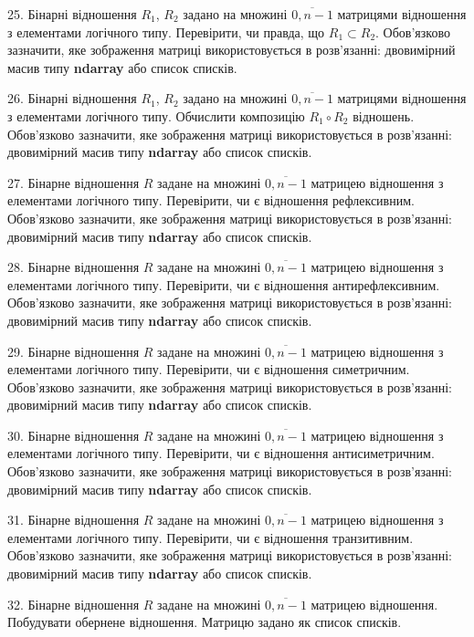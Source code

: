 \documentclass[10pt, ukrainian]{article}
\begin{document}
{\begin {Large}
25. Бінарні відношення $R_1$, $R_2$ задано на множині $\overline{0,n-1}$ матрицями відношення з елементами логічного типу. Перевірити, чи правда, що $R_1\subset R_2$. Обов'язково зазначити, яке зображення матриці використовується в розв'язанні: двовимірний масив типу \textbf{ndarray} або список списків.

26. Бінарні відношення $R_1$, $R_2$ задано на множині $\overline{0,n-1}$ матрицями відношення з елементами логічного типу. Обчислити композицію $R_1\circ R_2$ відношень. Обов'язково зазначити, яке зображення матриці використовується в розв'язанні: двовимірний масив типу \textbf{ndarray} або список списків.


27. Бінарне відношення $R$ задане на множині $\overline{0,n-1}$ матрицею відношення з елементами логічного типу. Перевірити, чи є відношення рефлексивним. Обов'язково зазначити, яке зображення матриці використовується в розв'язанні: двовимірний масив типу \textbf{ndarray} або список списків.

28. Бінарне відношення $R$ задане на множині $\overline{0,n-1}$ матрицею відношення з елементами логічного типу. Перевірити, чи є відношення антирефлексивним. Обов'язково зазначити, яке зображення матриці використовується в розв'язанні: двовимірний масив типу \textbf{ndarray} або список списків.

\newpage

29. Бінарне відношення $R$ задане на множині $\overline{0,n-1}$ матрицею відношення з елементами логічного типу. Перевірити, чи є відношення симетричним. Обов'язково зазначити, яке зображення матриці використовується в розв'язанні: двовимірний масив типу \textbf{ndarray} або список списків.

30. Бінарне відношення $R$ задане на множині $\overline{0,n-1}$ матрицею відношення з елементами логічного типу. Перевірити, чи є відношення антисиметричним. Обов'язково зазначити, яке зображення матриці використовується в розв'язанні: двовимірний масив типу \textbf{ndarray} або список списків.

31. Бінарне відношення $R$ задане на множині $\overline{0,n-1}$ матрицею відношення з елементами логічного типу. Перевірити, чи є відношення транзитивним. Обов'язково зазначити, яке зображення матриці використовується в розв'язанні: двовимірний масив типу \textbf{ndarray} або список списків.

32. Бінарне відношення $R$ задане на множині $\overline{0,n-1}$ матрицею відношення. Побудувати обернене відношення. Матрицю задано як список списків.


\end{Large}}
\end{document}

